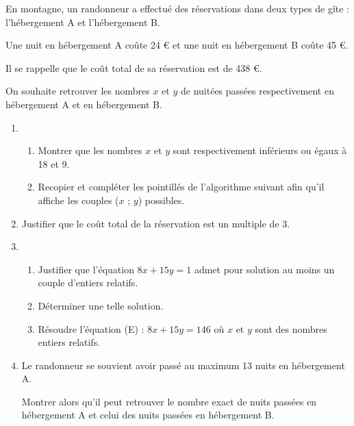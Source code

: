 \begin{colonne*exercice}


\begin{exercice}
  En montagne, un randonneur a effectué des réservations dans deux
  types de gîte : l'hébergement A et l'hébergement B.

Une nuit en hébergement A coûte 24 \euro{} et une nuit en  hébergement B coûte 45 \euro{}.

Il se rappelle que le coût  total de sa réservation est de 438 \euro{}.\medskip
 
On souhaite retrouver les nombres $x$ et $y$ de nuitées passées respectivement en hébergement A et en  hébergement B.
\begin{enumerate}
\item \begin{enumerate}
\item Montrer que les nombres $x$ et $y$ sont respectivement inférieurs ou égaux à 18 et 9.		
\item Recopier et compléter les pointillés de l'algorithme suivant afin qu'il affiche les couples ($x$ ; $y$) possibles.

\begin{center}
\begin{algorithme}
\BlocVariables
{}
\BlocTraitementsEtAffichage
{}
\end{algorithme}
\end{center}
\end{enumerate}

\item Justifier que le coût total de la réservation est un multiple de 3.
\item \begin{enumerate}
\item Justifier que l'équation $8x + 15y = 1$ admet pour solution au moins un couple d'entiers relatifs.
\item Déterminer une telle solution.
\item Résoudre l'équation (E) : $8x + 15y = 146$ où $x$ et $y$ sont des nombres entiers relatifs.
\end{enumerate}
\item Le randonneur se souvient avoir passé au maximum 13 nuits en hébergement A.

Montrer alors qu'il peut retrouver le nombre exact de nuits passées en hébergement A et celui des nuits passées en hébergement B.


\end{enumerate}
\end{exercice}
\end{colonne*exercice}
